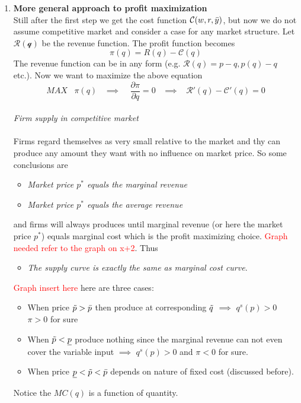 \documentclass[10pt]{article}
\newenvironment{changemargin}[2]{%
  \begin{list}{}{%
    \setlength{\topsep}{0pt}%
    \setlength{\leftmargin}{#1}%
    \setlength{\rightmargin}{#2}%
    \setlength{\listparindent}{\parindent}%
    \setlength{\itemindent}{\parindent}%
    \setlength{\parsep}{\parskip}%
  }%
  \item[]}{\end{list}}
\begin{document}
\begin{changemargin}{-0.125in}{0in}
\begin{enumerate}
\begin{enumerate}
        \\
        \item \textbf{More general approach to profit maximization}
        \\
        Still after the first step we get the cost function $\mathcal{C}(w,r,\Bar{y})$, but now we do not assume competitive market and consider a case for any market structure. Let $\mathcal{R(q)}$ be the revenue function. The profit function becomes 
        \[
        \pi(q) = R(q) - \mathcal{C}(q)
        \]
        The revenue function can be in any form (e.g. $\mathcal{R}(q) = p-q, p(q) - q$ etc.). Now we want to maximize the above equation
        \[
        MAX \;\;\; \pi(q) \;\;\;\implies\;\;\;\; \frac{\partial \pi}{\partial q} = 0 \;\;\;\implies\;\;\;\mathcal{R}'(q) - \mathcal{C}'(q) = 0
        \]
        \\
        \textit{Firm supply in competitive market}
        \\
        \\
        Firms regard themselves as very small relative to the market and thy can produce any amount they want with no influence on market price. So some conclusions are 
        \begin{itemize}
            \item \textit{Market price $p^*$ equals the marginal revenue}
            \item \textit{Market price $p^*$ equals the average revenue}
        \end{itemize}
        and firms will always produces until marginal revenue (or here the market price $p^*$) equals marginal cost which is the profit maximizing choice. \textcolor{red}{Graph needed refer to the graph on x+2}. Thus 
        \begin{itemize}
            \item \textit{The supply curve is exactly the same as marginal cost curve}.
        \end{itemize}
        \textcolor{red}{Graph insert here}
        here are three cases: 
        \begin{itemize}
            \item  When price $\Tilde{p} > \Bar{p}$ then produce at corresponding $\Tilde{q}$ $\implies$ $q^s(p) >0$ $\pi >0$ for sure
            \item  When $\Tilde{p} < \underline{p}$ produce nothing since the marginal revenue can not even cover the variable input $\implies$ $q^s(p) >0$ and $\pi <0$ for sure. 
            \item  When price $\underline{p}<\Tilde{p}<\Bar{p}$ depends on nature of fixed cost (discussed before).
        \end{itemize}
        Notice the $MC(q)$ is a function of quantity. 
        \bigskip
        

\end{enumerate}
\end{enumerate}
\end{changemargin}
\end{document}
